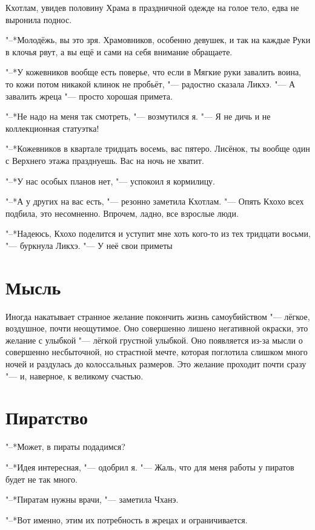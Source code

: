 \documentclass[a4paper,10pt,fleqn]{book}
\newcommand{\ldotst}{\so{...}\xspace}
\begin{document}
Кхотлам, увидев половину Храма в праздничной одежде на голое тело, едва не выронила поднос.

"--*Молодёжь, вы это зря.
Храмовников, особенно девушек, и так на каждые Руки в клочья рвут, а вы ещё и сами на себя внимание обращаете.

"--*У кожевников вообще есть поверье, что если в Мягкие руки завалить воина, то кожи потом никакой клинок не пробьёт, "--- радостно сказала Ликхэ.
"--- А завалить жреца "--- просто хорошая примета.

"--*Не надо на меня так смотреть, "--- возмутился я.
"--- Я не дичь и не коллекционная статуэтка!

"--*Кожевников в квартале тридцать восемь, вас пятеро.
Лисёнок, ты вообще один с Верхнего этажа празднуешь.
Вас на ночь не хватит.

"--*У нас особых планов нет, "--- успокоил я кормилицу.

"--*А у других на вас есть, "--- резонно заметила Кхотлам.
"--- Опять Кхохо всех подбила, это несомненно.
Впрочем, ладно, все взрослые люди.

"--*Надеюсь, Кхохо поделится и уступит мне хоть кого-то из тех тридцати восьми, "--- буркнула Ликхэ.
"--- У неё свои приметы\ldotst

\section{Мысль}

Иногда накатывает странное желание покончить жизнь самоубийством "--- лёгкое, воздушное, почти неощутимое.
Оно совершенно лишено негативной окраски, это желание с улыбкой "--- лёгкой грустной улыбкой.
Оно появляется из-за мысли о совершенно несбыточной, но страстной мечте, которая поглотила слишком много ночей и раздулась до колоссальных размеров.
Это желание проходит почти сразу "--- и, наверное, к великому счастью.

\section{Пиратство}

"--*Может, в пираты подадимся?

"--*Идея интересная, "--- одобрил я.
"--- Жаль, что для меня работы у пиратов будет не так много.

"--*Пиратам нужны врачи, "--- заметила Чханэ.

"--*Вот именно, этим их потребность в жрецах и ограничивается.
\end{document}
